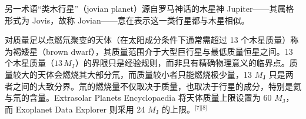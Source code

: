 另一术语“类木行星”（jovian planet）源自罗马神话的木星神 Jupiter——其属格形式为 Jovis，故称 Jovian——意在表示这一类行星都与木星相似。

对质量足以点燃氘聚变的天体（在太阳成分条件下通常需超过 13 个木星质量）称为褐矮星（brown dwarf），其质量范围介于大型巨行星与最低质量恒星之间。13 个木星质量（\(13\,M_{\mathrm{J}}\)）的界限只是经验规则，而非具有精确物理意义的临界点。质量较大的天体会燃烧其大部分氘，而质量较小者只能燃烧极少量，13 \(M_{\mathrm{J}}\) 只是两者之间的大致分界。氘的燃烧量不仅取决于质量，也取决于行星的成分，特别是氦与氘的含量。Extrasolar Planets Encyclopaedia 将天体质量上限设置为 60 \(M_{\mathrm{J}}\)，而 Exoplanet Data Explorer 则采用 24 \(M_{\mathrm{J}}\) 的上限。\(^\text{[7][8]}\)

